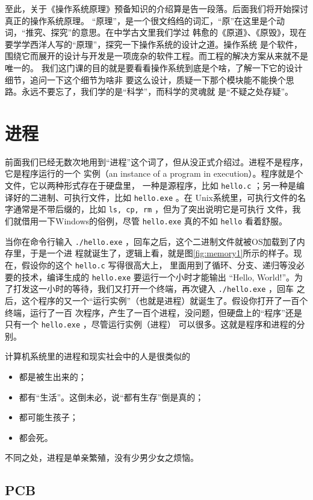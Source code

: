 \documentclass{wx672ctexart}
\newcommand\mpic[1]{%
  \marginpar{\texttt{[image: thumbnails/\#1]}}}
\begin{document}
至此，关于《操作系统原理》预备知识的介绍算是告一段落。后面我们将开始探讨真正的操作系统原理。
“原理”，是一个很文绉绉的词汇，“原”在这里是个动词，“推究、探究”的意思。在中学古文里我们学过
韩愈的《原道》、《原毁》，现在要学学西洋人写的“原理”，探究一下操作系统的设计之道。操作系统
是个软件，围绕它而展开的设计与开发是一项庞杂的软件工程。而工程的解决方案从来就不是唯一的。
我们这门课的目的就是要看看操作系统到底是个啥，了解一下它的设计细节，追问一下这个细节为啥非
要这么设计，质疑一下那个模块能不能换个思路。永远不要忘了，我们学的是“科学”，而科学的灵魂就
是“不疑之处存疑”。

\section{进程}
\label{sec:org15c22e8}

\mpic{pg_0052}前面我们已经无数次地用到“进程”这个词了，但从没正式介绍过。进程不是程序，它是程序运行的一个
实例（an instance of a program in execution）。程序就是个文件，它以两种形式存在于硬盘里，
一种是源程序，比如 \texttt{hello.c} ；另一种是编译好的二进制、可执行文件，比如 \texttt{hello.exe} 。在
Unix系统里，可执行文件的名字通常是不带后缀的，比如 \texttt{ls, cp, rm} ，但为了突出说明它是可执行
文件，我们就借用一下Windows的俗例，尽管 \texttt{hello.exe} 真的不如 \texttt{hello} 看着舒服。

当你在命令行输入 \texttt{./hello.exe} ，回车之后，这个二进制文件就被OS加载到了内存里，于是一个进
程就诞生了，逻辑上看，就是图\ref{fig:memory1}所示的样子。现在，假设你的这个 \texttt{hello.c} 写得很高大上，
里面用到了循环、分支、递归等没必要的技术，编译生成的 \texttt{hello.exe} 要运行一个小时才能输出
“Hello, World!”。为了打发这一小时的等待，我们又打开一个终端，再次键入 \texttt{./hello.exe} ，回车
之后，这个程序的又一个“运行实例”（也就是进程）就诞生了。假设你打开了一百个终端，运行了一百
次程序，产生了一百个进程，没问题，但硬盘上的“程序”还是只有一个 \texttt{hello.exe} ，尽管运行实例（进程）
可以很多。这就是程序和进程的分别。

计算机系统里的进程和现实社会中的人是很类似的
\begin{itemize}
\item 都是被生出来的；
\item 都有“生活”。这倒未必，说“都有生存”倒是真的；
\item 都可能生孩子；
\item 都会死。
\end{itemize}
不同之处，进程是单亲繁殖，没有少男少女之烦恼。

\subsection{PCB}
\label{sec:org8a0ed7a}
\end{document}
